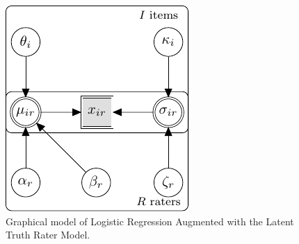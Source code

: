 \documentclass[a4paper,11pt]{article}
\begin{document}
\begin{figure}[!ht]
		\centering
		\includegraphics[width=\textwidth, page=8]{graphicalmodels.pdf}
	\caption{Graphical model of Logistic Regression Augmented with the Latent Truth Rater Model.}
	\label{model:Logistic_LTM}
\end{figure}
\end{document}
